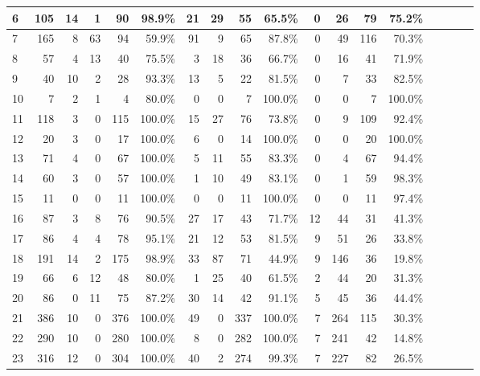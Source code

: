 \begin{table*}[t]
\begin{SmallOut}
\begin {tabular} {|l|r|r|r|r|r|r|r|r|r|r|r|r|r|r|r|r|r|}
6                 & 105  & 14  & 1  & 90  & 98.9\% & 21  & 29 & 55  & 65.5\% & 0  & 26& 79   & 75.2\%\\
\hline
7                 & 165  & 8   & 63 & 94  & 59.9\% & 91  & 9  & 65  & 87.8\% & 0  & 49& 116  & 70.3\%\\
\hline
8                 & 57  & 4    & 13 & 40  & 75.5\% & 3  & 18 & 36  & 66.7\% & 0   & 16& 41   & 71.9\%\\
\hline
9                 & 40  & 10   & 2  & 28  & 93.3\% & 13 & 5  & 22  & 81.5\% & 0  & 7 & 33    & 82.5\%\\
\hline
10                & 7   & 2    & 1  & 4   & 80.0\% & 0  & 0  & 7   & 100.0\%& 0  & 0 & 7     & 100.0\%\\
\hline\hline
11                & 118 & 3    & 0  & 115 & 100.0\%& 15 & 27 & 76  & 73.8\% & 0  & 9 & 109  & 92.4\%\\
\hline
12                & 20 & 3    &  0 & 17  & 100.0\%& 6  & 0  &  14 & 100.0\%& 0  & 0 & 20   & 100.0\%\\
\hline
13                & 71 & 4    & 0  & 67  & 100.0\%& 5  & 11 &  55 & 83.3\% & 0  & 4 & 67   & 94.4\%\\
\hline
14                & 60 & 3    & 0  & 57  & 100.0\%& 1  & 10 & 49  & 83.1\% & 0  & 1 & 59   & 98.3\%\\
\hline
15                & 11 & 0    & 0  & 11  & 100.0\%& 0  & 0  & 11  & 100.0\%& 0  & 0 & 11  & 97.4\%\\
\hline\hline
16                & 87   & 3  & 8  & 76  & 90.5\% & 27 & 17 & 43  & 71.7\% & 12 & 44 & 31  & 41.3\%\\
\hline
17                & 86   & 4  & 4  & 78  & 95.1\% & 21 & 12 & 53  & 81.5\% & 9  & 51 & 26  & 33.8\%\\
\hline
18                & 191  & 14 &  2 & 175 & 98.9\% & 33 & 87 & 71  & 44.9\% & 9  & 146& 36  & 19.8\%\\
\hline
19                & 66   & 6  & 12 & 48  & 80.0\% & 1  & 25 & 40  & 61.5\% & 2  & 44 & 20  & 31.3\%\\
\hline
20                & 86   & 0  & 11 & 75  & 87.2\% & 30 & 14 & 42  & 91.1\% & 5  & 45 & 36  & 44.4\%\\
\hline\hline
21                & 386  & 10 & 0  & 376 & 100.0\%& 49 & 0  & 337 & 100.0\%& 7  & 264 & 115 & 30.3\%\\
\hline
22                & 290  & 10 & 0  & 280 & 100.0\%& 8  & 0  & 282 & 100.0\%& 7  & 241 & 42  & 14.8\%\\
\hline
23                & 316  & 12 & 0  & 304 & 100.0\%& 40 & 2  & 274 & 99.3\% & 7  & 227 & 82  & 26.5\%\\

\end{tabular}
\end{SmallOut}
\end{table*}
